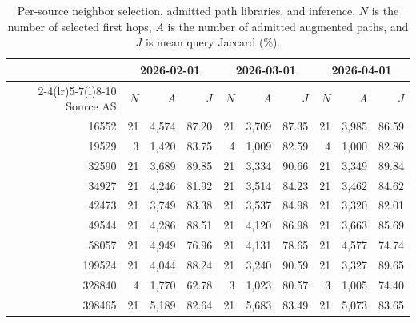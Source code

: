 \begin{table}[t]
\centering
\caption{Per-source neighbor selection, admitted path libraries, and inference. $N$ is the number of selected first hops, $A$ is the number of admitted augmented paths, and $J$ is mean query Jaccard (\%).}
\label{tab:per_source_results}
\small
\setlength{\tabcolsep}{6pt}
\begin{tabular}{@{}rrrrrrrrrr@{}}
\toprule
& \multicolumn{3}{c}{2026-02-01} & \multicolumn{3}{c}{2026-03-01} & \multicolumn{3}{c}{2026-04-01}\\
\cmidrule(lr){2-4}\cmidrule(lr){5-7}\cmidrule(l){8-10}
Source AS & $N$ & $A$ & $J$ & $N$ & $A$ & $J$ & $N$ & $A$ & $J$\\
\midrule
16552 & 21 & 4,574 & 87.20 & 21 & 3,709 & 87.35 & 21 & 3,985 & 86.59\\
19529 & 3 & 1,420 & 83.75 & 4 & 1,009 & 82.59 & 4 & 1,000 & 82.86\\
32590 & 21 & 3,689 & 89.85 & 21 & 3,334 & 90.66 & 21 & 3,349 & 89.84\\
34927 & 21 & 4,246 & 81.92 & 21 & 3,514 & 84.23 & 21 & 3,462 & 84.62\\
42473 & 21 & 3,749 & 83.38 & 21 & 3,537 & 84.98 & 21 & 3,320 & 82.01\\
49544 & 21 & 4,286 & 88.51 & 21 & 4,120 & 86.98 & 21 & 3,663 & 85.69\\
58057 & 21 & 4,949 & 76.96 & 21 & 4,131 & 78.65 & 21 & 4,577 & 74.74\\
199524 & 21 & 4,044 & 88.24 & 21 & 3,240 & 90.59 & 21 & 3,327 & 89.65\\
328840 & 4 & 1,770 & 62.78 & 3 & 1,023 & 80.57 & 3 & 1,005 & 74.40\\
398465 & 21 & 5,189 & 82.64 & 21 & 5,683 & 83.49 & 21 & 5,073 & 83.65\\
\bottomrule
\end{tabular}
\end{table}
